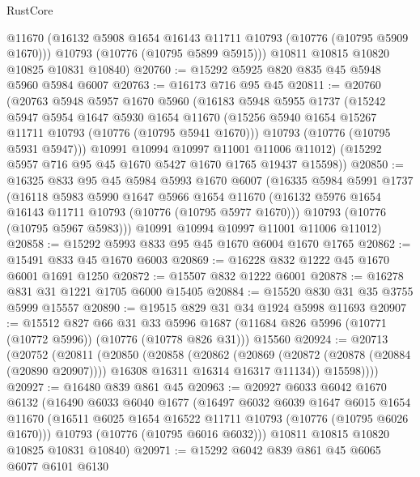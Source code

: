 \begin{lexlean}{RustCore}
\begin{coremodule}
        @11670
        (@16132 @5908 @1654 @16143 @11711 @10793 (@10776 (@10795 @5909 @1670)))
        @10793
        (@10776 (@10795 @5899 @5915)))
      @10811
      @10815
      @10820
      @10825
      @10831
      @10840)
@20760 := @15292 @5925 @820 @835 @45 @5948 @5960 @5984 @6007
@20763 := @16173 @716 @95 @45
@20811 := @20760
    (@20763
      @5948
      @5957
      @1670
      @5960
      (@16183
        @5948
        @5955
        @1737
        (@15242
          @5947
          @5954
          @1647
          @5930
          @1654
          @11670
          (@15256 @5940 @1654 @15267 @11711 @10793 (@10776 (@10795 @5941 @1670)))
          @10793
          (@10776 (@10795 @5931 @5947)))
        @10991
        @10994
        @10997
        @11001
        @11006
        @11012)
      (@15292 @5957 @716 @95 @45 @1670 @5427 @1670 @1765 @19437 @15598))
@20850 := @16325
    @833
    @95
    @45
    @5984
    @5993
    @1670
    @6007
    (@16335
      @5984
      @5991
      @1737
      (@16118
        @5983
        @5990
        @1647
        @5966
        @1654
        @11670
        (@16132 @5976 @1654 @16143 @11711 @10793 (@10776 (@10795 @5977 @1670)))
        @10793
        (@10776 (@10795 @5967 @5983)))
      @10991
      @10994
      @10997
      @11001
      @11006
      @11012)
@20858 := @15292 @5993 @833 @95 @45 @1670 @6004 @1670 @1765
@20862 := @15491 @833 @45 @1670 @6003
@20869 := @16228 @832 @1222 @45 @1670 @6001 @1691 @1250
@20872 := @15507 @832 @1222 @6001
@20878 := @16278 @831 @31 @1221 @1705 @6000 @15405
@20884 := @15520 @830 @31 @35 @3755 @5999 @15557
@20890 := @19515 @829 @31 @34 @1924 @5998 @11693
@20907 := @15512
    @827
    @66
    @31
    @33
    @5996
    @1687
    (@11684 @826 @5996 (@10771 (@10772 @5996)) (@10776 (@10778 @826 @31)))
    @15560
@20924 := @20713
    (@20752
      (@20811
        (@20850
          (@20858
            (@20862
              (@20869
                (@20872 (@20878 (@20884 (@20890 @20907))))
                @16308
                @16311
                @16314
                @16317
                @11134))
            @15598))))
@20927 := @16480 @839 @861 @45
@20963 := @20927
    @6033
    @6042
    @1670
    @6132
    (@16490
      @6033
      @6040
      @1677
      (@16497
        @6032
        @6039
        @1647
        @6015
        @1654
        @11670
        (@16511 @6025 @1654 @16522 @11711 @10793 (@10776 (@10795 @6026 @1670)))
        @10793
        (@10776 (@10795 @6016 @6032)))
      @10811
      @10815
      @10820
      @10825
      @10831
      @10840)
@20971 := @15292 @6042 @839 @861 @45 @6065 @6077 @6101 @6130

\end{coremodule}
\end{lexlean}
